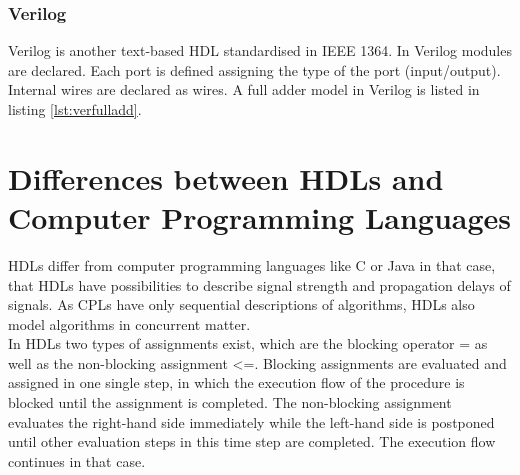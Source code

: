 \subsubsection{Verilog}
Verilog is another text-based HDL standardised in IEEE 1364. In Verilog modules are declared. Each port is defined assigning the type of the port (input/output). Internal wires are declared as wires. A full adder model in Verilog is listed in listing \ref{lst:verfulladd}.

\lstset{language=Verilog, tabsize=4}
\begin{center}
\end{center}

\section{Differences between HDLs and Computer Programming Languages}
HDLs differ from computer programming languages like C or Java in that case, that HDLs have possibilities to describe signal strength and propagation delays of signals. As CPLs have only sequential descriptions of algorithms, HDLs also model algorithms in concurrent matter.\\
In HDLs two types of assignments exist, which are the blocking operator = as well as the non-blocking assignment \textless=. Blocking assignments are evaluated and assigned in one single step, in which the execution flow of the procedure is blocked until the assignment is completed. The non-blocking assignment evaluates the right-hand side immediately while the left-hand side is postponed until other evaluation steps in this time step are completed. The execution flow continues in that case.\cite{Sut96}
